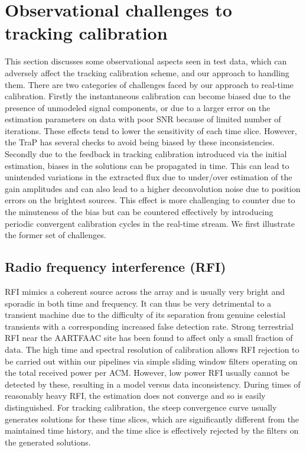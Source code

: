 \documentclass{aa}
\begin{document}
\section{\label{sec:Challenges-to-tracking}Observational challenges to tracking calibration}
This section  discusses some observational aspects  seen in test  data, which can
adversely affect the  tracking calibration scheme, and our  approach to handling
them.  There are two categories of challenges faced by our approach to real-time
calibration. Firstly the instantaneous calibration can become biased due to the
presence of  unmodeled signal components,  or due to  a larger error  on the
estimation  parameters on  data  with poor  SNR  because of  limited number  of
iterations.   These effects  tend to  lower the  sensitivity of  each time slice.
However,  the  TraP   has  several  checks  to  avoid   being  biased  by  these
inconsistencies.   Secondly  due  to   the  feedback  in  tracking  calibration
introduced via the initial estimation, biases in the solutions can be propagated
in time.   This can lead to unintended  variations in the extracted  flux due to
under/over estimation  of the  gain amplitudes  and can also  lead to  a higher
deconvolution noise due to position errors on the brightest sources. This effect
is more  challenging to counter due  to the minuteness  of the bias but  can be
countered effectively  by introducing periodic convergent  calibration cycles in
the real-time stream. We first illustrate the former set of challenges.

\subsection{Radio frequency interference (RFI)}

RFI mimics  a coherent source  across the array  and is usually very  bright and
sporadic in both time  and frequency.   It can  thus be  very detrimental  to a
transient machine due to the difficulty of its separation from genuine celestial
transients  with  a  corresponding   increased  false  detection  rate.   Strong
terrestrial RFI  near the \mbox{AARTFAAC} site  has been found to  affect only a
small fraction  of data.  The high  time and spectral  resolution of calibration
allows RFI rejection  to be carried out within our  pipelines via simple sliding
window  filters operating on  the total  received power  per ACM.   However, low
power RFI usually cannot be detected  by these, resulting in a model versus data
inconsistency.  During  times of reasonably  heavy RFI, the estimation  does not
converge and  so is easily  distinguished.  For tracking calibration,  the steep
convergence curve usually  generates solutions for these time  slices, which are
significantly different from  the maintained time history, and  the time slice is
effectively rejected by the filters on the generated solutions.
\end{document}
